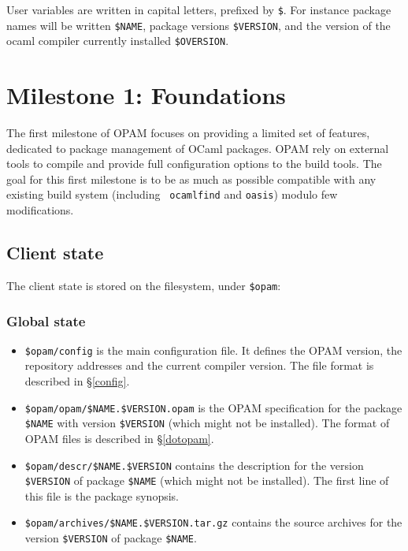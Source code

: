 \documentclass[a4paper,11pt]{article}
\begin{document}
User variables are written in capital letters, prefixed by \verb+$+. For
instance package names will be written \verb+$NAME+, package versions
\verb+$VERSION+, and the version of the ocaml compiler currently
installed \verb+$OVERSION+.

\section{Milestone 1: Foundations}

The first milestone of OPAM focuses on providing a limited set of
features, dedicated to package management of OCaml packages. OPAM rely
on external tools to compile and provide full configuration options to
the build tools. The goal for this first milestone is to be as much as
possible compatible with any existing build system (including {\tt
  ocamlfind} and {\tt oasis}) modulo few modifications.

\subsection{Client state}
\label{client}

The client state is stored on the filesystem, under {\tt \$opam}:

\subsubsection{Global state}
\label{state-global}

\begin{itemize}

\item {\tt \$opam/config} is the main configuration file. It defines
  the OPAM version, the repository addresses and the current compiler
  version. The file format is described in \S\ref{config}.

\item \verb+$opam/opam/$NAME.$VERSION.opam+ is the OPAM specification
  for the package \verb+$NAME+ with version \verb+$VERSION+ (which
  might not be installed). The format of OPAM files is described in
  \S\ref{dotopam}.

\item \verb+$opam/descr/$NAME.$VERSION+ contains the description for the
  version \verb+$VERSION+ of package \verb+$NAME+ (which might not be
  installed). The first line of this file is the package synopsis.

\item \verb+$opam/archives/$NAME.$VERSION.tar.gz+ contains the source
  archives for the version \verb+$VERSION+ of package \verb+$NAME+.

\end{itemize}
\end{document}
